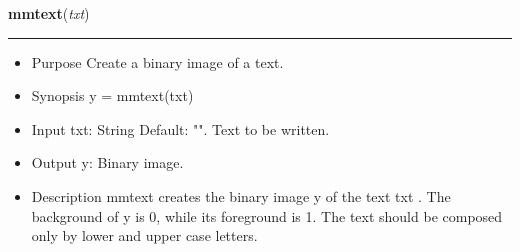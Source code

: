     \begin{boxedminipage}{\textwidth}

    \raggedright \textbf{mmtext}(\textit{txt})

    \vspace{-1.5ex}

    \rule{\textwidth}{0.5\fboxrule}
    \begin{itemize}
    \setlength{\parskip}{0.6ex}
      \item Purpose Create a binary image of a text.

      \item Synopsis y = mmtext(txt)

      \item Input txt: String Default: "". Text to be written.

      \item Output y: Binary image.

      \item Description mmtext creates the binary image y of the text txt . 
        The background of y is 0, while its foreground is 1. The text 
        should be composed only by lower and upper case letters.

    \end{itemize}

    \vspace{1ex}

    \end{boxedminipage}

    \label{multireg:num_pymorph:mmthick}
    \vspace{0.5ex}

